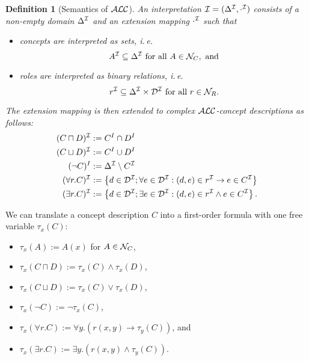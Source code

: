 \documentclass[openany]{scrbook}
\theoremstyle{break}
\newtheorem{Definition}[Theorem]{Definition}
\theoremstyle{nonumberbreak}
\theoremstyle{nonumberplain}
\theoremstyle{nonumberbreak}
\newcommand{\set}[1]{\left\{#1\right\}}
\newcommand{\ie}{i{.}\,e{.}\xspace}
\newcommand{\ALC}{{\cal A}{\cal L}{\cal C}}
\begin{document}
\begin{Definition}[Semantics of $\ALC$]
  \label{2.2}
  An interpretation ${\cal I} = (\Delta^{\cal I}, \cdot^{\cal I})$
  consists of a non-empty domain $\Delta^{\cal I}$ and an extension
  mapping $\cdot^{\cal I}$ such that
  \begin{itemize}
  \item concepts are interpreted as sets, \ie
    \begin{equation*}
      A^{\cal I} \subseteq \Delta^{\cal I}\ \text{for all}\ A \in
      {\cal N}_C,\ \text{and}
    \end{equation*}
  \item roles are interpreted as binary relations, \ie
    \begin{equation*}
      r^{\cal I} \subseteq \Delta^{\cal I} \times {\cal D}^{\cal I}\
      \text{for all}\ r \in {\cal N}_R.
    \end{equation*}
  \end{itemize}

  The extension mapping is then extended to complex $\ALC$-concept
  descriptions as follows:
  \begin{align*}
    (C \sqcap D)^{\cal I} & := C^I \cap D^I \\
    (C \sqcup D)^{\cal I} & := C^I \cup D^I \\
    (\neg C)^I & := \Delta^{\cal I} \setminus C^{\cal I} \\
    (\forall r.C)^{\cal I} & := \set{d \in {\cal D}^{\cal I}; \forall
      e \in {\cal D}^{\cal I}: (d, e) \in r^{\cal I} \to e \in C^{\cal
        I}} \\
    (\exists r.C)^{\cal I} & := \set{d \in {\cal D}^{\cal I}; \exists
      e \in {\cal D}^{\cal I}: (d, e) \in r^{\cal I} \wedge e \in
      C^{\cal I}}.
  \end{align*}
\end{Definition}

We can translate a concept description $C$ into a first-order formula
with one free variable $\tau_x(C)$:
\begin{itemize}
\item $\tau_x(A) := A(x)$ for $A \in {\cal N}_C$,
\item $\tau_x(C \sqcap D) := \tau_x(C) \wedge \tau_x(D)$,
\item $\tau_x(C \sqcup D) := \tau_x(C) \vee \tau_x(D)$,
\item $\tau_x(\neg C) := \neg \tau_x(C)$,
\item $\tau_x(\forall r.C) := \forall y.(r(x, y) \to \tau_y(C))$, and
\item $\tau_x(\exists r.C) := \exists y.(r(x, y) \wedge \tau_y(C))$.
\end{itemize}
\end{document}
